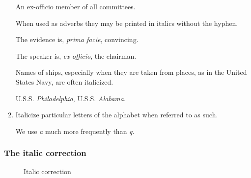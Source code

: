 \begin{enumerate}
     \hspace*{1em} An ex-officio member of all committees.


When used as adverbs they may be printed in italics without the hyphen.

\qquad The evidence is, \textit{prima facie}, convincing.

\qquad The speaker is, \textit{ex officio}, the chairman.

Names of ships, especially when they are taken from places, as in the United States Navy, are often italicized.

\qquad\qquad U.S.S. \textit{Philadelphia}, U.S.S. \textit{Alabama}.

\item  Italicize particular letters of the alphabet when referred to as such.

         We use \emph{a} much more frequently than \emph{q}.
\end{enumerate}



\subsubsection{The italic correction}

\begin{figure}[htbp]
\vspace*{1ex}
\centering
{}

\caption{Italic correction}
\end{figure}
